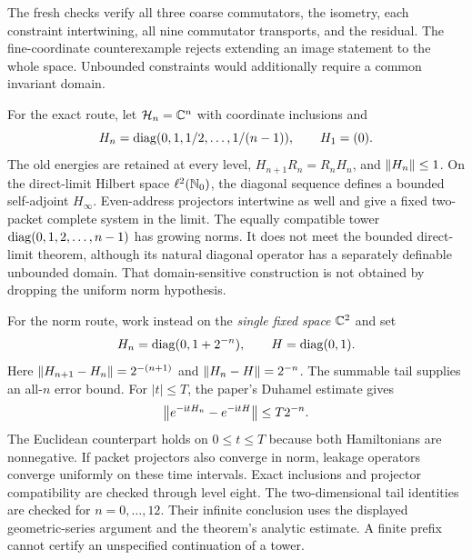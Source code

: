 The fresh checks verify all three coarse commutators, the isometry, each constraint intertwining, all nine commutator transports, and the residual. The fine-coordinate counterexample rejects extending an image statement to the whole space. Unbounded constraints would additionally require a common invariant domain.

For the exact route, let $\HH_n=\CC^n$ with coordinate inclusions and
\[
H_n=\operatorname{diag}(0,1,1/2,\ldots,1/(n-1)),\qquad H_1=(0).
\]
The old energies are retained at every level, $H_{n+1}R_n=R_nH_n$, and $\left\lVert H_n\right\rVert\leq1$. On the direct-limit Hilbert space $\ell^2(\NN_0)$, the diagonal sequence defines a bounded self-adjoint $H_\infty$. Even-address projectors intertwine as well and give a fixed two-packet complete system in the limit.
The equally compatible tower $\operatorname{diag}(0,1,2,\ldots,n-1)$ has growing norms. It does not meet the bounded direct-limit theorem, although its natural diagonal operator has a separately definable unbounded domain. That domain-sensitive construction is not obtained by dropping the uniform norm hypothesis.

For the norm route, work instead on the \emph{single fixed space} $\CC^2$ and set
\[
H_n=\operatorname{diag}(0,1+2^{-n}),\qquad H=\operatorname{diag}(0,1).
\]
Here $\left\lVert H_{n+1}-H_n\right\rVert=2^{-(n+1)}$ and $\left\lVert H_n-H\right\rVert=2^{-n}$. The summable tail supplies an all-$n$ error bound. For $|t|\leq T$, the paper's Duhamel estimate gives
\[
\norm{e^{-\ii tH_n}-e^{-\ii tH}}\leq T2^{-n}.
\]
The Euclidean counterpart holds on $0\leq t\leq T$ because both Hamiltonians are nonnegative. If packet projectors also converge in norm, leakage operators converge uniformly on these time intervals.
Exact inclusions and projector compatibility are checked through level eight. The two-dimensional tail identities are checked for $n=0,\ldots,12$. Their infinite conclusion uses the displayed geometric-series argument and the theorem's analytic estimate. A finite prefix cannot certify an unspecified continuation of a tower.

